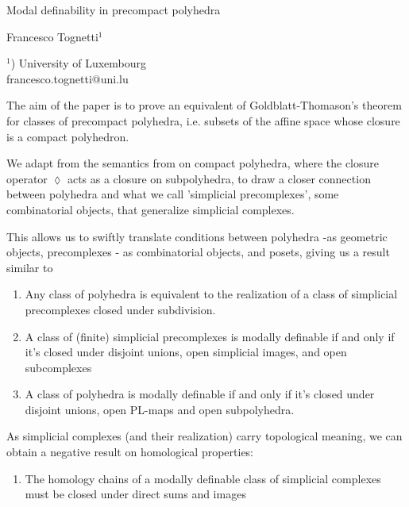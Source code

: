 \documentclass[a4paper]{article}
\begin{document}

\Large
 \begin{center}
Modal definability in precompact polyhedra\\ 

\hspace{10pt}

\large
Francesco Tognetti$^1$ \\

\hspace{10pt}

\small  
$^1$) University of Luxembourg\\
francesco.tognetti@uni.lu

\end{center}

\hspace{10pt}

\normalsize

\noindent The aim of the paper is to prove an equivalent of Goldblatt-Thomason's theorem for classes of precompact polyhedra, i.e. subsets of the affine space whose closure is a compact polyhedron.

	We adapt from the semantics from \cite{DBLP} on compact polyhedra, where the closure operator $\lozenge$ acts as a closure on subpolyhedra, to draw a closer connection between polyhedra and what we call 'simplicial precomplexes', some combinatorial objects, that generalize simplicial complexes.
	
	This allows us to swiftly translate conditions between polyhedra -as geometric objects,  precomplexes - as combinatorial objects, and posets, giving us a result similar to\cite{Stop}
	\begin{enumerate}
		\item  Any class of polyhedra is equivalent to the realization of a class of simplicial precomplexes closed under subdivision.
		\item A class of (finite) simplicial precomplexes is modally definable if and only if it's closed under disjoint unions, open simplicial images, and open subcomplexes
		\item A class of polyhedra is modally definable if and only if it's closed under disjoint unions, open PL-maps and open subpolyhedra.
	\end{enumerate}

\noindent As simplicial complexes (and their realization) carry topological meaning, we can obtain a negative result on homological properties:
\begin{enumerate}
	\addtocounter{enumi}{3}
	\item The homology chains of a modally definable class of simplicial complexes must be closed under direct sums and images
\end{enumerate}
\end{document}

